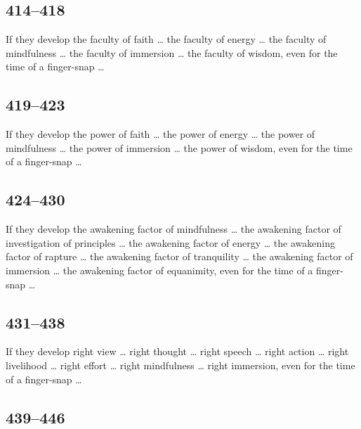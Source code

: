 \documentclass[12pt,openany]{book}%
\begin{document}
\subsection*{414–418 }

If they develop the faculty of faith … the faculty of energy … the faculty of mindfulness … the faculty of immersion … the faculty of wisdom, even for the time of a finger-snap … 

\subsection*{419–423 }

If they develop the power of faith … the power of energy … the power of mindfulness … the power of immersion … the power of wisdom, even for the time of a finger-snap … 

\subsection*{424–430 }

If they develop the awakening factor of mindfulness … the awakening factor of investigation of principles … the awakening factor of energy … the awakening factor of rapture … the awakening factor of tranquility … the awakening factor of immersion … the awakening factor of equanimity, even for the time of a finger-snap … 

\subsection*{431–438 }

If they develop right view … right thought … right speech … right action … right livelihood … right effort … right mindfulness … right immersion, even for the time of a finger-snap … 

\subsection*{439–446 }
\end{document}
